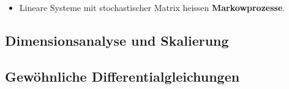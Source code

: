 \documentclass[a4paper]{article}
\begin{document}
\begin{itemize}
	\item Lineare Systeme mit stochastischer Matrix heissen
		\textbf{Markowprozesse}.
\end{itemize}

\subsection{Dimensionsanalyse und Skalierung}

\subsection{Gewöhnliche Differentialgleichungen}
\end{document}
